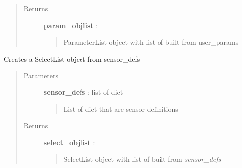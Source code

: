 \documentclass[letterpaper,10pt,english]{sphinxmanual}
\begin{document}
\begin{fulllineitems}
\begin{quote}
\begin{description}
\item[{Returns}] \leavevmode
\textbf{param\_objlist} : {\hyperref[taniumpy.object_types:taniumpy.object_types.parameter_list.ParameterList]{}}
\begin{quote}

ParameterList object with list of {\hyperref[taniumpy.object_types:taniumpy.object_types.parameter.Parameter]{}} built from user\_params
\end{quote}

\end{description}\end{quote}

\end{fulllineitems}


\begin{fulllineitems}
\label{pytan.utils:pytan.utils.build_selectlist_obj}
Creates a SelectList object from sensor\_defs
\begin{quote}\begin{description}
\item[{Parameters}] \leavevmode
\textbf{sensor\_defs} : list of dict
\begin{quote}

List of dict that are sensor definitions
\end{quote}

\item[{Returns}] \leavevmode
\textbf{select\_objlist} : {\hyperref[taniumpy.object_types:taniumpy.object_types.select_list.SelectList]{}}
\begin{quote}

SelectList object with list of {\hyperref[taniumpy.object_types:taniumpy.object_types.select.Select]{}} built from \emph{sensor\_defs}
\end{quote}

\end{description}\end{quote}

\end{fulllineitems}

\end{document}
